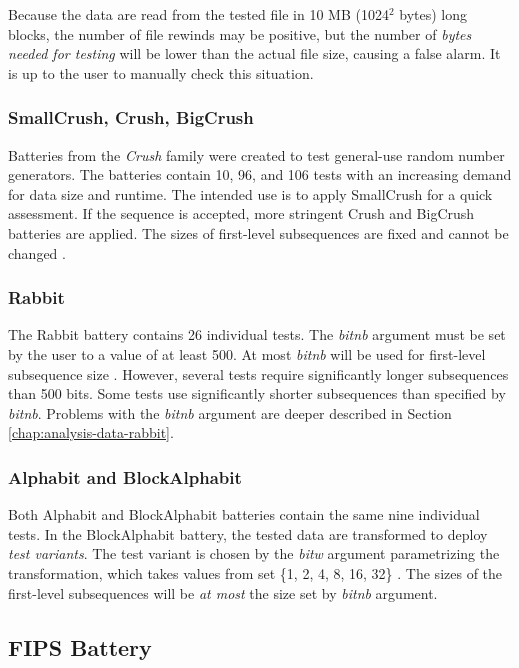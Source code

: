 \documentclass[
  digital,     %
  oneside,     %
  nosansbold,  %
  nocolorbold, %
  nolof,         %
  nolot,         %
]{fithesis4}
\begin{document}
Because the data are read from the tested file in 10 MB (1024$^2$ bytes) long blocks, the number of file rewinds may be positive, but the number of \emph{bytes needed for testing} will be lower than the actual file size, causing a false alarm. It is up to the user to manually check this situation. 


\subsubsection{SmallCrush, Crush, BigCrush}
Batteries from the \emph{Crush} family were created to test general-use random number generators. The batteries contain 10, 96, and 106 tests with an increasing demand for data size and runtime. The intended use is to apply SmallCrush for a quick assessment. If the sequence is accepted, more stringent Crush and BigCrush batteries are applied. The sizes of first-level subsequences are fixed and cannot be changed \cite[p. 242]{tu01_guide}.

\subsubsection{Rabbit}
The Rabbit battery contains 26 individual tests. The \emph{bit\textunderscore nb} argument must be set by the user to a value of at least 500. At most \emph{bit\textunderscore nb} will be used for first-level subsequence size \cite[p. 152]{tu01_guide}. However, several tests require significantly longer subsequences than 500 bits. Some tests use significantly shorter subsequences than specified by \emph{bit\textunderscore nb}. Problems with the \emph{bit\textunderscore nb} argument are deeper described in Section \ref{chap:analysis-data-rabbit}.

\subsubsection{Alphabit and BlockAlphabit}
Both Alphabit and BlockAlphabit batteries contain the same nine individual tests. In the BlockAlphabit battery, the tested data are transformed to deploy \emph{test variants}. The test variant is chosen by the \emph{bit\textunderscore w} argument parametrizing the transformation, which takes values from set \{1, 2, 4, 8, 16, 32\} \cite[p. 155]{tu01_guide}. The sizes of the first-level subsequences will be \emph{at most} the size set by \emph{bit\textunderscore nb} argument.


\subsection{FIPS Battery} \label{chap:sols-fips}
\end{document}
